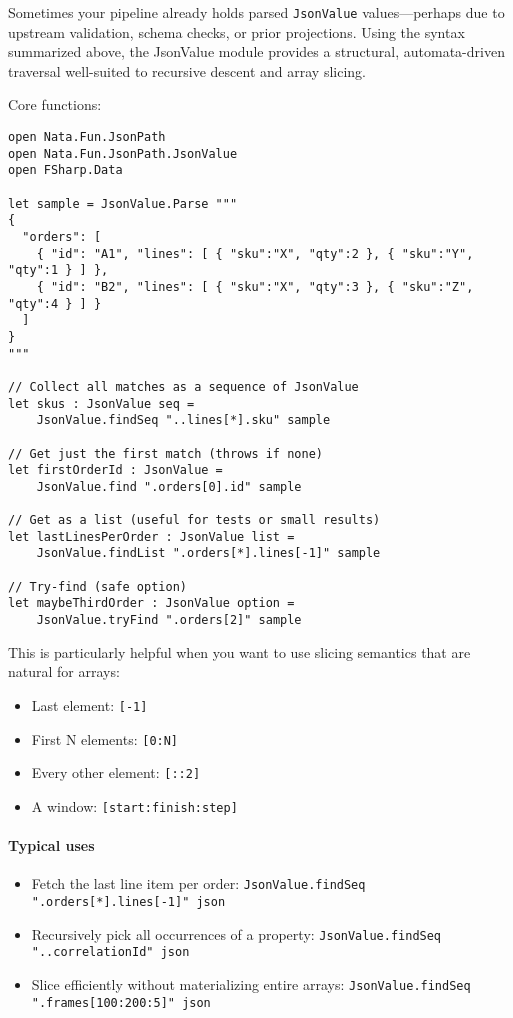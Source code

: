 \documentclass{article}
\begin{document}
Sometimes your pipeline already holds parsed \texttt{JsonValue} values—perhaps due to upstream validation, schema checks, or prior projections. Using the syntax summarized above, the JsonValue module provides a structural, automata-driven traversal well-suited to recursive descent and array slicing.

Core functions:

\begin{verbatim}
open Nata.Fun.JsonPath
open Nata.Fun.JsonPath.JsonValue
open FSharp.Data

let sample = JsonValue.Parse """
{
  "orders": [
    { "id": "A1", "lines": [ { "sku":"X", "qty":2 }, { "sku":"Y", "qty":1 } ] },
    { "id": "B2", "lines": [ { "sku":"X", "qty":3 }, { "sku":"Z", "qty":4 } ] }
  ]
}
"""

// Collect all matches as a sequence of JsonValue
let skus : JsonValue seq =
    JsonValue.findSeq "..lines[*].sku" sample

// Get just the first match (throws if none)
let firstOrderId : JsonValue =
    JsonValue.find ".orders[0].id" sample

// Get as a list (useful for tests or small results)
let lastLinesPerOrder : JsonValue list =
    JsonValue.findList ".orders[*].lines[-1]" sample

// Try-find (safe option)
let maybeThirdOrder : JsonValue option =
    JsonValue.tryFind ".orders[2]" sample
\end{verbatim}

This is particularly helpful when you want to use slicing semantics that are natural for arrays:

\begin{itemize}
  \item Last element: \texttt{[-1]}
  \item First N elements: \texttt{[0:N]}
  \item Every other element: \texttt{[::2]}
  \item A window: \texttt{[start:finish:step]}
\end{itemize}

\paragraph{Typical uses}
\begin{itemize}
  \item Fetch the last line item per order: \texttt{JsonValue.findSeq ".orders[*].lines[-1]" json}
  \item Recursively pick all occurrences of a property: \texttt{JsonValue.findSeq "..correlationId" json}
  \item Slice efficiently without materializing entire arrays: \texttt{JsonValue.findSeq ".frames[100:200:5]" json}
\end{itemize}
\end{document}
